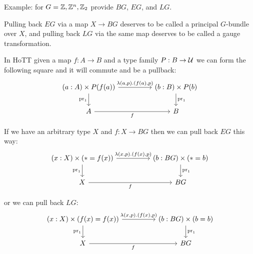 \documentclass[12pt]{report}
\begin{document}
Example: for $G=\mathbb{Z}, \mathbb{Z}^n, \mathbb{Z}_2 $ provide $BG$, $EG$, and $LG$.

Pulling back $EG$ via a map $X\to BG$ deserves to be called a principal $G$-bundle over $X$, and pulling back $LG$ via the same map deserves to be called a gauge transformation.

In HoTT given a map $f:A\to B$ and a type family $P:B\to \mathcal{U}$ we can form the following square and it will commute and be a pullback:
\[\begin{tikzcd}
	{(a:A)\times P(f(a))} && {(b:B)\times P(b)} \\
	A && B
	\arrow["{\mathrm{pr}_1}", from=1-3, to=2-3]
	\arrow["{\lambda(a, p).(f(a),p)}", from=1-1, to=1-3]
	\arrow["f"', from=2-1, to=2-3]
	\arrow["{\mathrm{pr}_1}"', from=1-1, to=2-1]
\end{tikzcd}\]

If we have an arbitrary type $X$ and $f:X\to BG$ then we can pull back $EG$ this way:
\[\begin{tikzcd}
	{(x:X)\times (*=f(x))} && {(b:BG)\times (*=b)} \\
	X && BG
	\arrow["{\mathrm{pr}_1}", from=1-3, to=2-3]
	\arrow["{\lambda(x, p).(f(x),p)}", from=1-1, to=1-3]
	\arrow["f"', from=2-1, to=2-3]
	\arrow["{\mathrm{pr}_1}"', from=1-1, to=2-1]
\end{tikzcd}\]

or we can pull back $LG$:
\[\begin{tikzcd}
	{(x:X)\times (f(x)=f(x))} && {(b:BG)\times (b=b)} \\
	X && BG
	\arrow["{\mathrm{pr}_1}", from=1-3, to=2-3]
	\arrow["{\lambda(x, p).(f(x),p)}", from=1-1, to=1-3]
	\arrow["f"', from=2-1, to=2-3]
	\arrow["{\mathrm{pr}_1}"', from=1-1, to=2-1]
\end{tikzcd}\]
\end{document}

